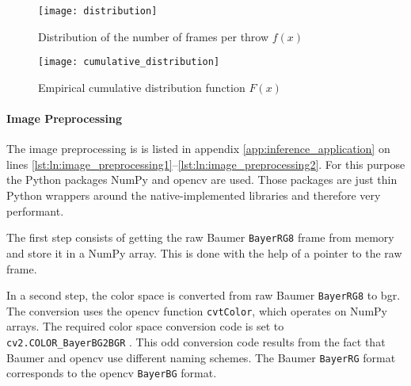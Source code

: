 \begin{figure}
  \centering
  \texttt{[image: distribution]}
  \caption{Distribution of the number of frames per throw $f(x)$}
  \label{fig:distribution}
\end{figure}

\begin{figure}
  \centering
  \texttt{[image: cumulative\_distribution]}
  \caption{Empirical cumulative distribution function $F(x)$}
  \label{fig:cumulative_distribution}
\end{figure}

\paragraph{Image Preprocessing}
The image preprocessing is is listed in appendix \ref{app:inference_application} on lines \ref{lst:ln:image_preprocessing1}--\ref{lst:ln:image_preprocessing2}.
For this purpose the Python packages NumPy and \acrshort{opencv} are used.
Those packages are just thin Python wrappers around the native-implemented libraries and therefore very performant.

The first step consists of getting the raw Baumer \texttt{BayerRG8} frame from memory and store it in a NumPy array.
This is done with the help of a pointer to the raw frame.

In a second step, the color space is converted from raw Baumer \texttt{BayerRG8} to \acrshort{bgr}.
The conversion uses the \acrshort{opencv} function \texttt{cvtColor}, which operates on NumPy arrays.
The required color space conversion code is set to \texttt{cv2.COLOR\_BayerBG2BGR} \cite{}. %
This odd conversion code results from the fact that Baumer and \acrshort{opencv} use different naming schemes.
The Baumer \texttt{BayerRG} format corresponds to the \acrshort{opencv} \texttt{BayerBG} format.

